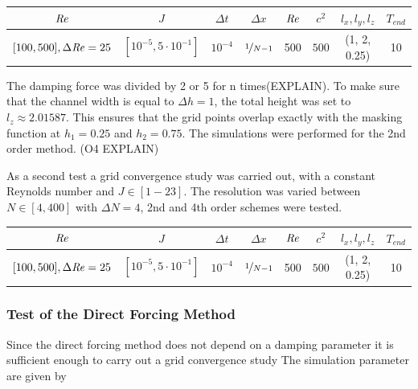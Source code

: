 \begin{center}
\vspace*{0.7ex}
\begin{tabular}{c|c|c|c|c|c|c|c }
 $ \mbox{\textit{Re}}  $                      & $J$ &  $\Delta t$ & $\Delta x$            & $\mbox{\textit{Re}}$  & $c^2$   & $l_x, l_y, l_z$ & $T_{end}$\\
\hline
 $[100, 500], \Delta \mbox{\textit{Re}} = 25 $& $[10^{-5}, 5\cdot10^{-1}]  $ &  $10^{-4}$ & $\nicefrac{1}{N - 1}$ & 500     & $500$   & (1, 2, 0.25)  & 10\\
\end{tabular}
\vspace*{0.7ex}
\end{center}

The damping force was divided by 2 or 5 for n times(EXPLAIN).
To make sure that the channel width is equal to $\Delta h = 1$, the total height was set to $l_z\approx2.01587$.
This ensures that the grid points overlap exactly with the masking function at $h_1=0.25$ and $h_2=0.75$.
The simulations were performed for the 2nd order method. (O4 EXPLAIN)

As a second test a grid convergence study was carried out, with a constant Reynolds number and $J \in [1-23]$.
The resolution was varied between $N\in [4, 400]$ with $\Delta N = 4$, 2nd and 4th order schemes were tested.

\begin{center}
\vspace*{0.7ex}
\begin{tabular}{c|c|c|c|c|c|c|c }
 $ \mbox{\textit{Re}}  $                      & $J$ &  $\Delta t$ & $\Delta x$            & $\mbox{\textit{Re}}$  & $c^2$   & $l_x, l_y, l_z$ & $T_{end}$\\
\hline
 $[100, 500], \Delta \mbox{\textit{Re}} = 25 $& $[10^{-5}, 5\cdot10^{-1}]  $ &  $10^{-4}$ & $\nicefrac{1}{N - 1}$ & 500     & $500$   & (1, 2, 0.25)  & 10\\
\end{tabular}
\vspace*{0.7ex}
\end{center}

\subsubsection{Test of the Direct Forcing Method}

Since the direct forcing method does not depend on a damping parameter it is sufficient enough
to carry out a grid convergence study
The simulation parameter are given by

